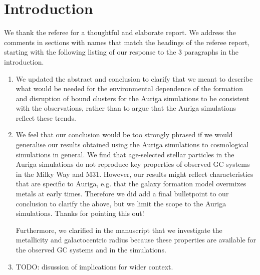 \documentclass{article}
\begin{document}
\section*{Introduction}
We thank the referee for a thoughtful and elaborate report. We address the 
comments in sections with names that match
the headings of the referee report, starting with the following listing of our 
response to the 3 paragraphs in the introduction.
\begin{enumerate}
\item We updated the abstract and conclusion to clarify that we meant to describe
what would be needed for the environmental dependence of the formation and disruption
of bound clusters for the Auriga simulations to be consistent with the observations,
rather than to argue that the Auriga simulations reflect these trends.
\item
We feel that our conclusion would be too strongly phrased if we would generalise 
our results obtained using the Auriga simulations to cosmological simulations 
in general. We find that age-selected stellar particles in the Auriga simulations 
do not reproduce key properties of observed GC systems in the Milky Way and M31.
However, our results might reflect characteristics that are specific to Auriga, 
e.g. that the galaxy formation model overmixes metals at early times. 
Therefore we did add a final bulletpoint to our conclusion to clarify the above, 
but we limit the scope to the Auriga simulations. Thanks for pointing this out!

Furthermore, we clarified in the manuscript that we investigate the metallicity
and galactocentric radius because these properties are available for the observed
GC systems and in the simulations.
\item TODO: disussion of implications for wider context.
\end{enumerate}
\end{document}
